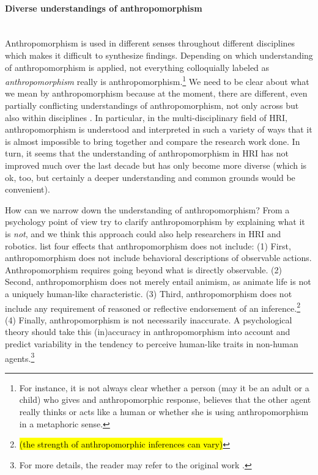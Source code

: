 \documentclass{frontiersSCNS} %
\begin{document}
\paragraph*{Diverse understandings of anthropomorphism\\ \\}

Anthropomorphism is used in different senses throughout different disciplines \citep{duffy_anthropomorphism_2003} which makes it difficult to synthesize findings. Depending on which understanding of anthropomorphism is applied, not everything colloquially labeled as \emph{anthropomorphism} really is anthropomorphism.\footnote{For instance, it is not always clear whether a person (may it be an adult or a child) who gives and anthropomorphic response, believes that the other agent really thinks or acts like a human or whether she is using anthropomorphism in a metaphoric sense.\citep{leeds_childrens_1992}} We need to be clear about what we mean by anthropomorphism because at the moment, there are different, even partially conflicting understandings of anthropomorphism, not only across but also within disciplines \cite{duffy_anthropomorphism_2002}. In particular, in the multi-disciplinary field of HRI, anthropomorphism is understood and interpreted in such a variety of ways that it is almost impossible to bring together and compare the research work done. In turn, it seems that the understanding of anthropomorphism in HRI has not improved much over the last decade but has only become more diverse (which is ok, too, but certainly a deeper understanding and common grounds would be convenient). 

How can we narrow down the understanding of anthropomorphism? From a psychology point of view \cite{epley_when_2008} try to clarify anthropomorphism by explaining what it is \textit{not}, and we think this approach could also help researchers in HRI and robotics. \cite{epley_when_2008} list four effects that anthropomorphism does not include:
(1) First, anthropomorphism does not include behavioral descriptions of observable actions. Anthropomorphism requires going beyond what is directly observable.
(2) Second, anthropomorphism does not merely entail animism, as animate life is not a uniquely human-like characteristic.
(3) Third, anthropomorphism does not include any requirement of reasoned or reflective endorsement of an inference.\footnote{\hl{(the strength of anthropomorphic inferences can vary)}}
(4) Finally, anthropomorphism is not necessarily inaccurate. A psychological theory should take this (in)accuracy in anthropomorphism into account and predict variability in the tendency to perceive human-like traits in non-human agents.\footnote{For more details, the reader may refer to the original work \citep{epley_when_2008}.}
\end{document}
